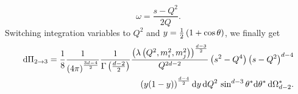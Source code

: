        \begin{equation}
            \omega = \frac{s-Q^2}{2Q}.
        \end{equation}
        Switching integration variables to \(Q^2\) and \(y = \frac{1}{2}\left(1 + \cos\theta\right)\), we finally get
        \begin{align}
            \nonumber
            \mathrm{d}\Pi_{2\to 3} = \frac{1}{8} \frac{1}{\left(4\pi\right)^{\frac{3d-4}{2}}} \frac{1}{\Gamma\left(\frac{d-2}{2}\right)} \frac{\left(\lambda\left(Q^2, m_i^2, m_j^2\right)\right)^{\frac{d-3}{2}}}{Q^{2d-2}} \left(s^2-Q^4\right)\left(s-Q^2\right)^{d-4} \\
            \left(y(1-y)\right)^{\frac{d-4}{2}} \mathrm{d}y\, \mathrm{d}Q^2\, \sin^{d-3}\theta^\ast \mathrm{d}\theta^\ast\, \mathrm{d}\Omega^\ast_{d-2}.
        \end{align}





